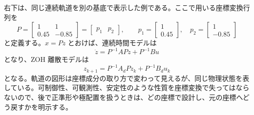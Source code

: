 右下は、同じ連続軌道を別の基底で表示した例である。ここで用いる座標変換行列を
\begin{equation}
  P=\begin{bmatrix}
    1&1\\
    0.45&-0.85
  \end{bmatrix}
  =\begin{bmatrix}p_1&p_2\end{bmatrix},\qquad
  p_1=\begin{bmatrix}1\\0.45\end{bmatrix},\quad
  p_2=\begin{bmatrix}1\\-0.85\end{bmatrix}
  \label{eq:state-transition-coordinate-p}
\end{equation}
と定義する。$x=Pz$ とおけば、連続時間モデルは
\begin{equation}
  \dot{z}=P^{-1}APz+P^{-1}Bu
\end{equation}
となり、ZOH 離散モデルは
\begin{equation}
  z_{k+1}=P^{-1}A_dPz_k+P^{-1}B_d u_k
  \label{eq:coordinate-transformed-discrete-model}
\end{equation}
となる。軌道の図形は座標成分の取り方で変わって見えるが、同じ物理状態を表している。可制御性、可観測性、安定性のような性質を座標変換で失ってはならないので、後で正準形や極配置を扱うときは、どの座標で設計し、元の座標へどう戻すかを明示する。

